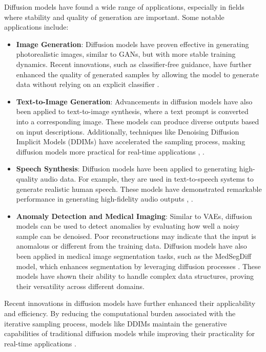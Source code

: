 Diffusion models have found a wide range of applications, especially in fields where stability and quality of generation are important. Some notable applications include:
\begin{itemize}
    \item \textbf{Image Generation}: Diffusion models have proven effective in generating photorealistic images, similar to GANs, but with more stable training dynamics. Recent innovations, such as classifier-free guidance, have further enhanced the quality of generated samples by allowing the model to generate data without relying on an explicit classifier \citep{10.48550/arxiv.2207.12598}.
    \item \textbf{Text-to-Image Generation}: Advancements in diffusion models have also been applied to text-to-image synthesis, where a text prompt is converted into a corresponding image. These models can produce diverse outputs based on input descriptions. Additionally, techniques like Denoising Diffusion Implicit Models (DDIMs) have accelerated the sampling process, making diffusion models more practical for real-time applications \citep{10.48550/arxiv.2010.02502}, \citep{10.48550/arxiv.2111.15640}.
    \item \textbf{Speech Synthesis}: Diffusion models have been applied to generating high-quality audio data. For example, they are used in text-to-speech systems to generate realistic human speech. These models have demonstrated remarkable performance in generating high-fidelity audio outputs \citep{10.48550/arxiv.2201.11972}, \citep{10.48550/arxiv.2009.09761}.
    \item \textbf{Anomaly Detection and Medical Imaging}: Similar to VAEs, diffusion models can be used to detect anomalies by evaluating how well a noisy sample can be denoised. Poor reconstructions may indicate that the input is anomalous or different from the training data. Diffusion models have also been applied in medical image segmentation tasks, such as the MedSegDiff model, which enhances segmentation by leveraging diffusion processes \citep{10.48550/arxiv.2211.00611}. These models have shown their ability to handle complex data structures, proving their versatility across different domains.
\end{itemize}

Recent innovations in diffusion models have further enhanced their applicability and efficiency. By reducing the computational burden associated with the iterative sampling process, models like DDIMs maintain the generative capabilities of traditional diffusion models while improving their practicality for real-time applications \citep{10.48550/arxiv.2101.02388}.

